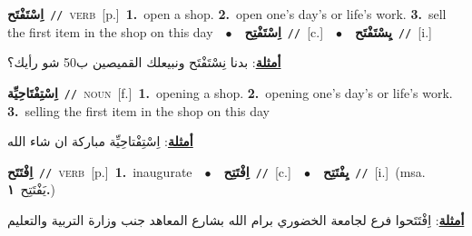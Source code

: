 \documentclass[10pt,a4paper,twoside]{article} %
\begin{document}
\begin{multicols}{2}
{\setlength\topsep{0pt}\textbf{\foreignlanguage{arabic}{اِسْتَفْتَح}}\ {\color{gray}\texttt{//}\color{black}}\ \textsc{verb}\ [p.]\ \textbf{1.}~open a shop.  \textbf{2.}~open one's day's or life's work.  \textbf{3.}~sell the first item in the shop on this day\ \ $\bullet$\ \ \setlength\topsep{0pt}\textbf{\foreignlanguage{arabic}{اِسْتَفْتِح}}\ {\color{gray}\texttt{//}\color{black}}\ [c.]\ \ $\bullet$\ \ \setlength\topsep{0pt}\textbf{\foreignlanguage{arabic}{يِسْتَفْتَح}}\ {\color{gray}\texttt{//}\color{black}}\ [i.]\  \begin{flushright}\color{gray}\foreignlanguage{arabic}{\textbf{\underline{\foreignlanguage{arabic}{أمثلة}}}: بدنا نِسْتَفْتَح ونبيعلك القميصين ب50 شو رأيك؟}\end{flushright}\color{black}} \vspace{2mm}

{\setlength\topsep{0pt}\textbf{\foreignlanguage{arabic}{اِسْتِفْتَاحِيِّة}}\ {\color{gray}\texttt{//}\color{black}}\ \textsc{noun}\ [f.]\ \textbf{1.}~opening a shop.  \textbf{2.}~opening one's day's or life's work.  \textbf{3.}~selling the first item in the shop on this day\  \begin{flushright}\color{gray}\foreignlanguage{arabic}{\textbf{\underline{\foreignlanguage{arabic}{أمثلة}}}: اِسْتِفْتاحِيِّة مباركة ان شاء الله}\end{flushright}\color{black}} \vspace{2mm}

{\setlength\topsep{0pt}\textbf{\foreignlanguage{arabic}{اِفْتَتَح}}\ {\color{gray}\texttt{//}\color{black}}\ \textsc{verb}\ [p.]\ \textbf{1.}~inaugurate\ \ $\bullet$\ \ \setlength\topsep{0pt}\textbf{\foreignlanguage{arabic}{اِفْتَتِح}}\ {\color{gray}\texttt{//}\color{black}}\ [c.]\ \ $\bullet$\ \ \setlength\topsep{0pt}\textbf{\foreignlanguage{arabic}{يِفْتَتِح}}\ {\color{gray}\texttt{//}\color{black}}\ [i.]\ \color{gray}(msa. \foreignlanguage{arabic}{يَفْتَتِح}~\foreignlanguage{arabic}{\textbf{١.}})\color{black}\  \begin{flushright}\color{gray}\foreignlanguage{arabic}{\textbf{\underline{\foreignlanguage{arabic}{أمثلة}}}: اِفْتَتَحوا فرع لجامعة الخضوري برام الله بشارع المعاهد جنب وزارة التربية والتعليم}\end{flushright}\color{black}} \vspace{2mm}


\end{multicols}
\end{document}
